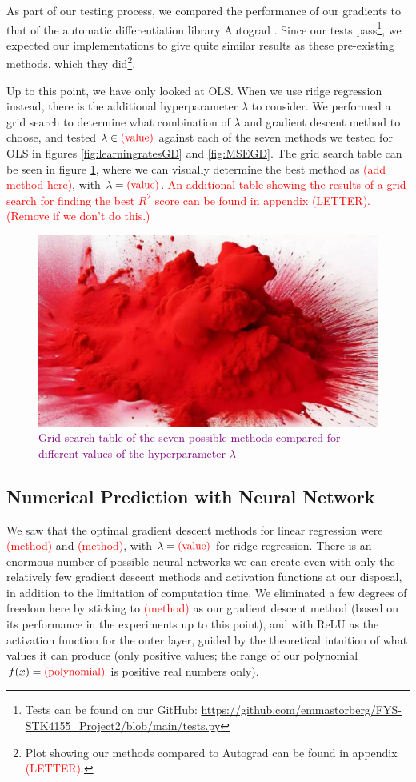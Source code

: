 As part of our testing process, we compared the performance of our gradients to that of the automatic differentiation library Autograd \cite{autograd}. Since our tests pass\footnote{Tests can be found on our GitHub: \url{https://github.com/emmastorberg/FYS-STK4155_Project2/blob/main/tests.py}}, we expected our implementations to give quite similar results as these pre-existing methods, which they did\footnote{Plot showing our methods compared to Autograd can be found in appendix \textcolor{red}{(LETTER)}.}. 

Up to this point, we have only looked at OLS. When we use ridge regression instead, there is the additional hyperparameter $\lambda$ to consider. We performed a grid search to determine what combination of $\lambda$ and gradient descent method to choose, and tested $\lambda \in \text{\textcolor{red}{(value)}}$ against each of the seven methods we tested for OLS in figures \ref{fig:learningratesGD} and \ref{fig:MSEGD}. The grid search table can be seen in figure \ref{fig:gridsearch_ridge}, where we can visually determine the best method as \textcolor{red}{(add method here)}, with $\lambda = \text{\textcolor{red}{(value)}}$. \textcolor{red}{An additional table showing the results of a grid search for finding the best $R^2$ score can be found in appendix (LETTER). (Remove if we don't do this.)} 
\begin{figure}
    \centering
    \includegraphics[width=0.5\linewidth]{figures/placeholders/gridsearch_ridge.png}
    \caption{\textcolor{purple}{Grid search table of the seven possible methods compared for different values of the hyperparameter $\lambda$}}
    \label{fig:gridsearch_ridge}
\end{figure}

\subsection{Numerical Prediction with Neural Network}
We saw that the optimal gradient descent methods for linear regression were \textcolor{red}{(method)} and \textcolor{red}{(method)}, with $\lambda = \text{\textcolor{red}{(value)}}$ for ridge regression. There is an enormous number of possible neural networks we can create even with only the relatively few gradient descent methods and activation functions at our disposal, in addition to the limitation of computation time. We eliminated a few degrees of freedom here by sticking to \textcolor{red}{(method)} as our gradient descent method (based on its performance in the experiments up to this point), and with ReLU as the activation function for the outer layer, guided by the theoretical intuition of what values it can produce (only positive values; the range of our polynomial $f(x) = \text{\textcolor{red}{(polynomial)}}$ is positive real numbers only).

